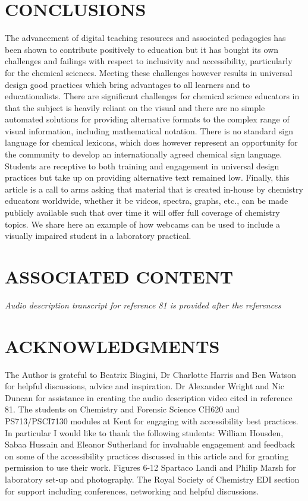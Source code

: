 \documentclass[11.5pt]{sig-alternate} %
\begin{document}
\begin{large}
\section*{CONCLUSIONS}
The advancement of digital teaching resources and associated pedagogies has been shown to contribute positively to education but it has bought its own challenges and failings with respect to inclusivity and accessibility, particularly for the chemical sciences. Meeting these challenges however results in universal design good practices which bring advantages to all learners and to educationalists.  There are significant challenges for chemical science educators in that the subject is heavily reliant on the visual and there are no simple automated solutions for providing alternative formats to the complex range of visual information, including mathematical notation. There is no standard sign language for chemical lexicons, which does however represent an opportunity for the community to develop an internationally agreed chemical sign language. Students are receptive to both training and engagement in universal design practices but take up on providing alternative text remained low. Finally, this article is a call to arms asking that material that is created in-house by chemistry educators worldwide, whether it be videos, spectra, graphs, etc., can be made publicly available such that over time it will offer full coverage of chemistry topics. We share here an example of how webcams can be used to include a visually impaired student in a laboratory practical.

\section*{ASSOCIATED CONTENT}
\textit{Audio description transcript for reference 81 is provided after the references}

\section*{ACKNOWLEDGMENTS}
The Author is grateful to Beatrix Biagini, Dr Charlotte Harris and Ben Watson for helpful discussions, advice and inspiration. Dr Alexander Wright and Nic Duncan for assistance in creating the audio description video cited in reference 81. The students on Chemistry and Forensic Science CH620 and PS713/PSCI7130 modules at Kent for engaging with accessibility best practices. In particular I would like to thank the following students: William Housden, Sabaa Hussain and Eleanor Sutherland for invaluable engagement and feedback on some of the accessibility practices discussed in this article and for granting permission to use their work. Figures 6-12 Spartaco Landi and Philip Marsh for laboratory set-up and photography. The Royal Society of Chemistry EDI section for support including conferences, networking and helpful discussions.

\end{large}
\clearpage
\end{document}
